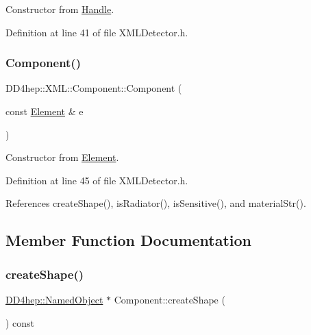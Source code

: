 Constructor from \hyperlink{class_d_d4hep_1_1_handle}{Handle}. 



Definition at line 41 of file X\+M\+L\+Detector.\+h.

\hypertarget{struct_d_d4hep_1_1_x_m_l_1_1_component_ab53e39ae951e177a0dc7e608611848a0}{}\label{struct_d_d4hep_1_1_x_m_l_1_1_component_ab53e39ae951e177a0dc7e608611848a0} 
\subsubsection{\texorpdfstring{Component()}{Component()}\hspace{0.1cm}{\footnotesize\ttfamily [2/2]}}
{\footnotesize\ttfamily D\+D4hep\+::\+X\+M\+L\+::\+Component\+::\+Component (\begin{DoxyParamCaption}\item[{const \hyperlink{class_d_d4hep_1_1_x_m_l_1_1_element}{Element} \&}]{e }\end{DoxyParamCaption})\hspace{0.3cm}{\ttfamily [inline]}}



Constructor from \hyperlink{class_d_d4hep_1_1_x_m_l_1_1_element}{Element}. 



Definition at line 45 of file X\+M\+L\+Detector.\+h.



References create\+Shape(), is\+Radiator(), is\+Sensitive(), and material\+Str().



\subsection{Member Function Documentation}
\hypertarget{struct_d_d4hep_1_1_x_m_l_1_1_component_a3ca538523212995d2d8f81e99097e2ee}{}\label{struct_d_d4hep_1_1_x_m_l_1_1_component_a3ca538523212995d2d8f81e99097e2ee} 
\subsubsection{\texorpdfstring{create\+Shape()}{createShape()}}
{\footnotesize\ttfamily \hyperlink{class_d_d4hep_1_1_named_object}{D\+D4hep\+::\+Named\+Object} $\ast$ Component\+::create\+Shape (\begin{DoxyParamCaption}{ }\end{DoxyParamCaption}) const}



